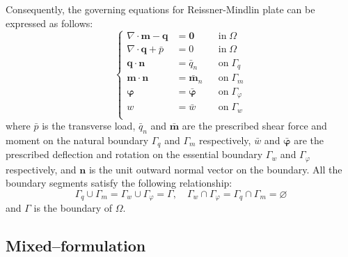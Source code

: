 Consequently, the governing equations for Reissner-Mindlin plate can be expressed as follows:
\begin{equation}
\left \{
\begin{aligned}
\nabla \cdot \boldsymbol m - \boldsymbol q &= \boldsymbol 0 & &\textrm{in}\; \Omega \\
\nabla \cdot \boldsymbol q + \bar p &= 0 & &\textrm{in}\; \Omega \\
\boldsymbol q \cdot \boldsymbol  n &= \bar q_n & &\textrm{on}\; \Gamma_q \\
\boldsymbol m \cdot \boldsymbol n &= \bar{\boldsymbol m}_n & &\textrm{on}\; \Gamma_m \\
\boldsymbol \varphi &= \bar{\boldsymbol \varphi} & &\textrm{on}\; \Gamma_\varphi \\
w &= \bar w & &\textrm{on}\; \Gamma_w \\
\end{aligned}
\right .
\end{equation}
where $\bar p$ is the transverse load,
$\bar q_n$ and $\bar{\boldsymbol m}$ are the prescribed shear force and moment on the natural boundary $\Gamma_q$ and $\Gamma_m$ respectively,
$\bar w$ and $\bar{\boldsymbol \varphi}$ are the prescribed deflection and rotation on the essential boundary $\Gamma_w$ and $\Gamma_\varphi$ respectively,
and $\boldsymbol n$ is the unit outward normal vector on the boundary.
All the boundary segments satisfy the following relationship:
\begin{equation}
\Gamma_q \cup \Gamma_m = \Gamma_w \cup \Gamma_\varphi = \Gamma
,\quad
\Gamma_w \cap \Gamma_\varphi = \Gamma_q \cap \Gamma_m = \varnothing
\end{equation}
and $\Gamma$ is the boundary of $\Omega$.


\subsection{Mixed--formulation}

